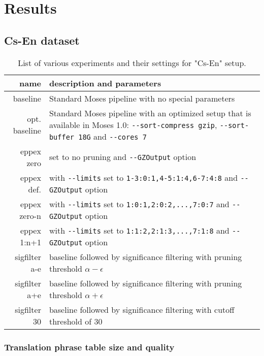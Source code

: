 \chapter{Results}
\label{chap:results}

\section{Cs-En dataset}

\begin{table}[ht]
\centering
\begin{tabular}{ r p{10cm} }
name & description and parameters \\
\hline
\hline
baseline        & Standard Moses pipeline with no special parameters \\
opt. baseline   & Standard Moses pipeline with an optimized setup that is
available in Moses 1.0:
\verb|--sort-compress gzip|, \verb|--sort-buffer 18G| and \verb|--cores 7| \\
eppex zero      & \eppex{} set to no pruning and \verb|--GZOutput| option \\
eppex def.      & \eppex{} with \verb|--limits| set to \verb|1-3:0:1,4-5:1:4,6-7:4:8| and \verb|--GZOutput| option \\
eppex zero-n    & \eppex{} with \verb|--limits| set to \verb|1:0:1,2:0:2,...,7:0:7| and \verb|--GZOutput| option \\
eppex 1:n+1     & \eppex{} with \verb|--limits| set to \verb|1:1:2,2:1:3,...,7:1:8| and \verb|--GZOutput| option \\
sigfilter a-e   & baseline followed by significance filtering with pruning threshold $\alpha - \epsilon$ \\
sigfilter a+e   & baseline followed by significance filtering with pruning threshold $\alpha + \epsilon$ \\
sigfilter 30    & baseline followed by significance filtering with cutoff threshold of 30 \\
\hline
\hline
\end{tabular}
\caption{\label{cs-en-wmt13-scenarios}List of various experiments and their
settings for "Cs-En" setup.}
\end{table}

\subsection{Translation phrase table size and quality}

